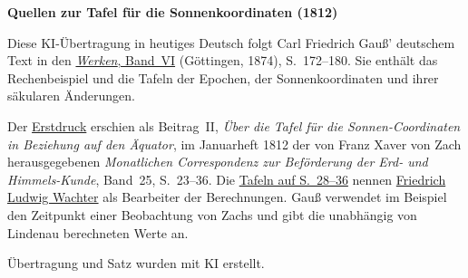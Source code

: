 \clearpage\thispagestyle{empty}
\begin{center}\textbf{Quellen zur Tafel für die Sonnenkoordinaten (1812)}\end{center}
\noindent Diese KI-Übertragung in heutiges Deutsch folgt Carl Friedrich Gauß’ deutschem Text in den \href{https://gdz.sub.uni-goettingen.de/id/PPN236007467}{\textit{Werken}, Band~VI} (Göttingen, 1874), S.~172--180. Sie enthält das Rechenbeispiel und die Tafeln der Epochen, der Sonnenkoordinaten und ihrer säkularen Änderungen.
\par\smallskip\noindent Der \href{https://www.digitale-sammlungen.de/en/view/bsb10538614?page=29}{Erstdruck} erschien als Beitrag~II, \textit{Über die Tafel für die Sonnen-Coordinaten in Beziehung auf den Äquator}, im Januarheft 1812 der von Franz Xaver von Zach herausgegebenen \textit{Monatlichen Correspondenz zur Beförderung der Erd- und Himmels-Kunde}, Band~25, S.~23--36. Die \href{https://www.digitale-sammlungen.de/en/view/bsb10538614?page=34}{Tafeln auf S.~28--36} nennen \href{https://www.deutsche-biographie.de/gnd134127897.html#ndbcontent}{Friedrich Ludwig Wachter} als Bearbeiter der Berechnungen. Gauß verwendet im Beispiel den Zeitpunkt einer Beobachtung von Zachs und gibt die unabhängig von Lindenau berechneten Werte an.
\par\smallskip\noindent Übertragung und Satz wurden mit KI erstellt.
\clearpage
